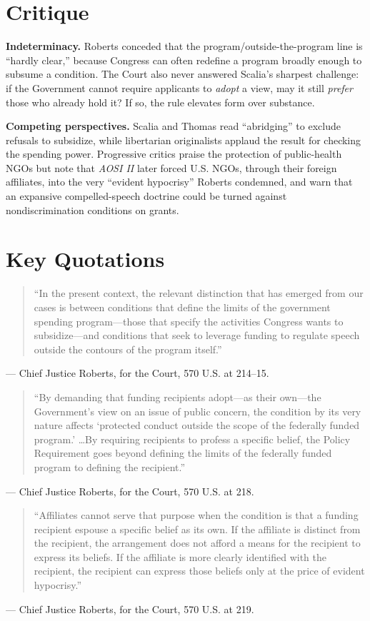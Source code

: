 \documentclass[12pt]{article}
\begin{document}
\section{Critique}

\textbf{Indeterminacy.} Roberts conceded that the program/outside-the-program line is ``hardly clear,'' because Congress can often redefine a program broadly enough to subsume a condition. The Court also never answered Scalia's sharpest challenge: if the Government cannot require applicants to \emph{adopt} a view, may it still \emph{prefer} those who already hold it? If so, the rule elevates form over substance.

\textbf{Competing perspectives.} Scalia and Thomas read ``abridging'' to exclude refusals to subsidize, while libertarian originalists applaud the result for checking the spending power. Progressive critics praise the protection of public-health NGOs but note that \textit{AOSI II} later forced U.S. NGOs, through their foreign affiliates, into the very ``evident hypocrisy'' Roberts condemned, and warn that an expansive compelled-speech doctrine could be turned against nondiscrimination conditions on grants.

\section{Key Quotations}

\begin{quote}
``In the present context, the relevant distinction that has emerged from our cases is between conditions that define the limits of the government spending program---those that specify the activities Congress wants to subsidize---and conditions that seek to leverage funding to regulate speech outside the contours of the program itself.''
\end{quote}
\noindent --- Chief Justice Roberts, for the Court, 570 U.S. at 214--15.

\begin{quote}
``By demanding that funding recipients adopt---as their own---the Government's view on an issue of public concern, the condition by its very nature affects `protected conduct outside the scope of the federally funded program.' \ldots By requiring recipients to profess a specific belief, the Policy Requirement goes beyond defining the limits of the federally funded program to defining the recipient.''
\end{quote}
\noindent --- Chief Justice Roberts, for the Court, 570 U.S. at 218.

\begin{quote}
``Affiliates cannot serve that purpose when the condition is that a funding recipient espouse a specific belief as its own. If the affiliate is distinct from the recipient, the arrangement does not afford a means for the recipient to express its beliefs. If the affiliate is more clearly identified with the recipient, the recipient can express those beliefs only at the price of evident hypocrisy.''
\end{quote}
\noindent --- Chief Justice Roberts, for the Court, 570 U.S. at 219.
\end{document}
